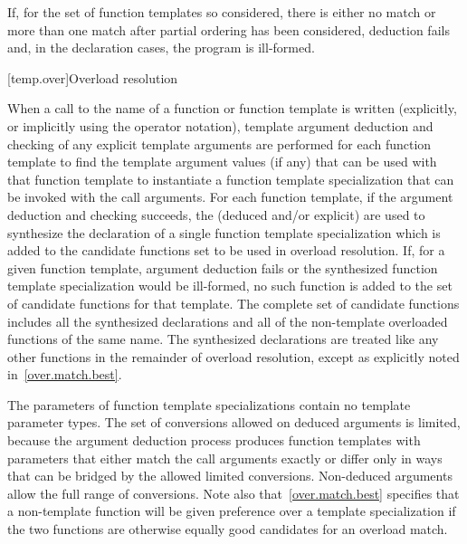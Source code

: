 \pnum
If, for the set of function templates so considered, there is either no match or
more than one match after partial ordering has been considered,
deduction fails and, in the declaration cases, the
program is ill-formed.

[temp.over]{Overload resolution}

\pnum
{}%
When a call to the name of a function or function template
is written (explicitly, or implicitly using the
operator notation), template argument deduction
and checking of any explicit template arguments are performed
for each function template to find the template argument values (if any) that
can be used with that function template to instantiate a function template
specialization that can be invoked with the call arguments.
For each function template, if the argument deduction and checking succeeds,
the
(deduced and/or explicit)
are used to synthesize the declaration of
a single function template specialization which is
added to the candidate functions set to be used in overload resolution.
If, for a given function template, argument deduction fails or
the synthesized function template specialization would be ill-formed,
no such function is added to the set of candidate functions for that template.
The complete set of candidate functions includes all the synthesized
declarations and all of the non-template overloaded functions of
the same name.
The synthesized declarations are
treated like any other functions in
the remainder of overload resolution, except as explicitly noted
in~\ref{over.match.best}.
\begin{footnote}
The parameters of function template
specializations contain no
template parameter types.
The set of conversions allowed on deduced arguments is limited, because the
argument deduction process produces function templates with parameters that
either match the call arguments exactly or differ only in ways that can be
bridged by the allowed limited conversions.
Non-deduced arguments allow the full range of conversions.
Note also that~\ref{over.match.best} specifies that a non-template function will
be given preference over a template specialization if the two functions
are otherwise equally good candidates for an overload match.
\end{footnote}

